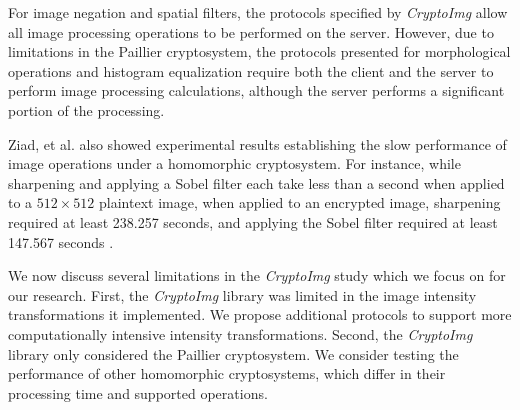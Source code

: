 For image negation and spatial filters, the protocols specified by \textit{CryptoImg} allow all image processing operations to be performed on the server. However, due to limitations in the Paillier cryptosystem, the protocols presented for morphological operations and histogram equalization require both the client and the server to perform image processing calculations, although the server performs a significant portion of the processing.

Ziad, et al. also showed experimental results establishing the slow performance of image operations under a homomorphic cryptosystem. For instance, while sharpening and applying a Sobel filter each take less than a second when applied to a $512\times 512$ plaintext image, when applied to an encrypted image, sharpening required at least 238.257 seconds, and applying the Sobel filter required at least 147.567 seconds \cite{ziad_cryptoimg:_2016}.


We now discuss several limitations in the \textit{CryptoImg} study which we focus on for our research. First, the \textit{CryptoImg} library was limited in the image intensity transformations it implemented. We propose additional protocols to support more computationally intensive intensity transformations.
Second, the \textit{CryptoImg} library only considered the Paillier cryptosystem. We consider testing the performance of other homomorphic cryptosystems, which differ in their processing time and supported operations.
